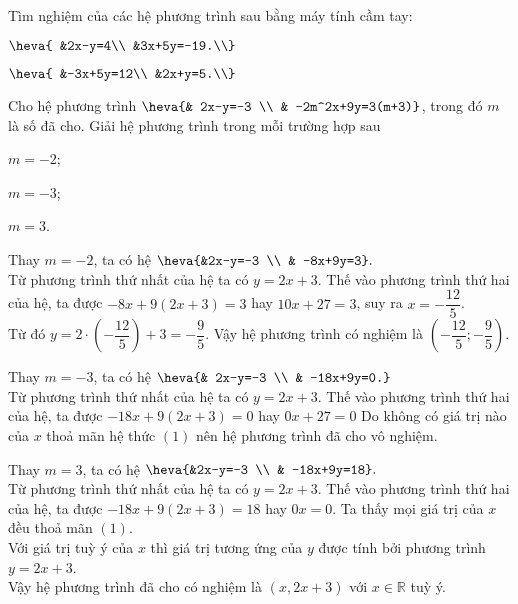 \begin{bt}
	Tìm nghiệm của các hệ phương trình sau bằng máy tính cầm tay:
	\begin{listEX}[2]
	\item $\heva{
	&2x-y=4\\ 
	&3x+5y=-19.\\}$
	\item $\heva{
	&-3x+5y=12\\ 
	&2x+y=5.\\}$
	\end{listEX}
\end{bt}
\begin{bt}
	Cho hệ phương trình $\heva{& 2x-y=-3 \\ & -2m^2x+9y=3(m+3)}$, trong đó $m$ là số đã cho. Giải hệ phương trình trong mỗi trường hợp sau
	\begin{listEX}[3]
	\item $m=-2$;
	\item $m=-3$;
	\item $m=3$.
	\end{listEX}
	\loigiai
	{
	\begin{listEX}[1]
	\item Thay $m=-2$, ta có hệ $\heva{&2x-y=-3 \\ & -8x+9y=3}.$\\
	Từ phương trình thứ nhất của hệ ta có $y=2x+3$. Thế vào phương trình thứ hai của hệ, ta được $-8x+9(2x+3)=3$ hay $10x+27=3$, suy ra $x=-\dfrac{12}{5}$.\\
	Từ đó $y=2\cdot\left(-\dfrac{12}{5}\right)+3=-\dfrac{9}{5}$. Vậy hệ phương trình có nghiệm là $\left(-\dfrac{12}{5};-\dfrac{9}{5}\right) $.
	\item Thay $m=-3$, ta có hệ $\heva{& 2x-y=-3 \\ & -18x+9y=0.}$\\
	Từ phương trình thứ nhất của hệ ta có $y=2x+3$. Thế vào phương trình thứ hai của hệ, ta được $-18x+9(2x+3)=0$ hay $0x+27=0$\noindent
	Do không có giá trị nào của $x$ thoả mãn hệ thức $(1)$ nên hệ phương trình đã cho vô nghiệm.
	\item Thay $m=3$, ta có hệ $\heva{&2x-y=-3 \\ & -18x+9y=18}.$\\
	Từ phương trình thứ nhất của hệ ta có $y=2x+3$. Thế vào phương trình thứ hai của hệ, ta được $-18x+9(2x+3)=18$ hay $0x=0$.\noindent
	Ta thấy mọi giá trị của $x$ đều thoả mãn $(1)$.\\
	Với giá trị tuỳ ý của $x$ thì giá trị tương ứng của $y$ được tính bởi phương trình $y=2x+3$.\\
	Vậy hệ phương trình đã cho có nghiệm là $(x,2x+3)$ với $x\in\mathbb{R}$ tuỳ ý.
	\end{listEX}
	}
\end{bt}
